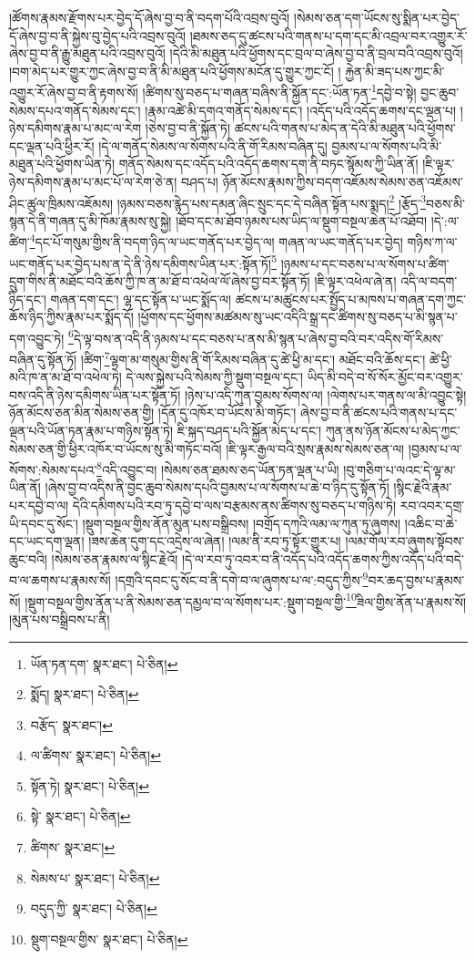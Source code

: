 །ཚོགས་རྣམས་རྫོགས་པར་བྱེད་དོ་ཞེས་བྱ་བ་ནི་བདག་པོའི་འབྲས་བུའོ། །སེམས་ཅན་དག་ཡོངས་སུ་སྨིན་པར་བྱེད་དོ་ཞེས་བྱ་བ་ནི་སྐྱེས་བུ་བྱེད་པའི་འབྲས་བུའོ། །ཐམས་ཅད་དུ་ཚངས་པའི་གནས་པ་དག་དང་མི་འབྲལ་བར་འགྱུར་རོ་ཞེས་བྱ་བ་ནི་རྒྱུ་མཐུན་པའི་འབྲས་བུའོ། །དེའི་མི་མཐུན་པའི་ཕྱོགས་དང་བྲལ་བ་ཞེས་བྱ་བ་ནི་བྲལ་བའི་འབྲས་བུའོ། །བག་མེད་པར་གྱུར་ཀྱང་ཞེས་བྱ་བ་ནི་མི་མཐུན་པའི་ཕྱོགས་མངོན་དུ་གྱུར་ཀྱང་ངོ། །
རྐྱེན་མི་ཟད་པས་ཀྱང་མི་འགྱུར་རོ་ཞེས་བྱ་བ་ནི་རྟགས་སོ། །ཚིགས་སུ་བཅད་པ་གཞན་བཞིས་ནི་སྐྱོན་དང་:ཡོན་ཏན་\footnote{ཡོན་ཏན་དག་  སྣར་ཐང་།  པེ་ཅིན། }དབྱེ་བ་སྟེ། བྱང་ཆུབ་སེམས་དཔའ་གནོད་སེམས་དང་། །རྣམ་འཚེ་མི་དགའ་གནོད་སེམས་དང་། །འདོད་པའི་འདོད་ཆགས་དང་ལྡན་པ། །ཉེས་དམིགས་རྣམ་པ་མང་ལ་རེག །ཅེས་བྱ་བ་ནི་སྐྱོན་ཏེ། ཚངས་པའི་གནས་པ་མེད་ན་དེའི་མི་མཐུན་པའི་ཕྱོགས་དང་ལྡན་པའི་ཕྱིར་རོ། །དེ་ལ་གནོད་སེམས་ལ་སོགས་པའི་ནི་གོ་རིམས་བཞིན་དུ། བྱམས་པ་ལ་སོགས་པའི་མི་མཐུན་པའི་ཕྱོགས་ཡིན་ཏེ། གནོད་སེམས་དང་འདོད་པའི་འདོད་ཆགས་དག་ནི་བཏང་སྙོམས་ཀྱི་ཡིན་ནོ། །ཇི་ལྟར་ཉེས་དམིགས་རྣམ་པ་མང་པོ་ལ་རེག་ཅེ་ན། བཤད་པ། ཉོན་མོངས་རྣམས་ཀྱིས་བདག་འཇོམས་སེམས་ཅན་འཇོམས་ཤིང་ཚུལ་ཁྲིམས་འཇོམས། །ཉམས་བཅས་རྙེད་པས་དམན་ཞིང་སྲུང་དང་དེ་བཞིན་སྟོན་པས་སྨད།\footnote{སྨོད།  སྣར་ཐང་།  པེ་ཅིན། } །རྩོད་\footnote{བརྩོད་  སྣར་ཐང་། }བཅས་མི་སྙན་དེ་ནི་གཞན་དུ་མི་ཁོམ་རྣམས་སུ་སྐྱེ། །ཐོབ་དང་མ་ཐོབ་ཉམས་པས་ཡིད་ལ་སྡུག་བསྔལ་ཆེན་པོ་འཐོབ། །དེ་:ལ་ཚིག་\footnote{ལ་ཚིགས་  སྣར་ཐང་།  པེ་ཅིན། }དང་པོ་གསུམ་གྱིས་ནི་བདག་ཉིད་ལ་ཡང་གནོད་པར་བྱེད་ལ། གཞན་ལ་ཡང་གནོད་པར་བྱེད། གཉིས་ཀ་ལ་ཡང་གནོད་པར་བྱེད་པས་ན་དེ་ནི་ཉེས་དམིགས་ཡིན་པར་:སྟོན་ཏོ།\footnote{སྟོན་ཏེ།  སྣར་ཐང་།  པེ་ཅིན། } །ཉམས་པ་དང་བཅས་པ་ལ་སོགས་པ་ཚིག་དྲུག་གིས་ནི་མཐོང་བའི་ཆོས་ཀྱི་ཁ་ན་མ་ཐོ་བ་འཕེལ་ལོ་ཞེས་བྱ་བར་སྟོན་ཏོ། །ཇི་ལྟར་འཕེལ་ཞེ་ན། འདི་ལ་བདག་ཉིད་དང་། གཞན་དག་དང་། ལྷ་དང་སྟོན་པ་ཡང་སྨོད་ལ། ཚངས་པ་མཚུངས་པར་སྤྱོད་པ་མཁས་པ་གཞན་དག་ཀྱང་ཆོས་ཉིད་ཀྱིས་རྣམ་པར་སྨོད་དོ། །ཕྱོགས་དང་ཕྱོགས་མཚམས་སུ་ཡང་འདིའི་སྒྲ་དང་ཚིགས་སུ་བཅད་པ་མི་སྙན་པ་དག་འབྱུང་ཏེ། \footnote{སྟེ་  སྣར་ཐང་།  པེ་ཅིན། }དེ་ལྟ་བས་ན་འདི་ནི་ཉམས་པ་དང་བཅས་པ་ནས་མི་སྙན་པ་ཞེས་བྱ་བའི་བར་འདིས་གོ་རིམས་བཞིན་དུ་སྟོན་ཏོ། །ཚིག་\footnote{ཚིགས་  སྣར་ཐང་། }ལྷག་མ་གསུམ་གྱིས་ནི་གོ་རིམས་བཞིན་དུ་ཚེ་ཕྱི་མ་དང་། མཐོང་བའི་ཆོས་དང་། ཚེ་ཕྱི་མའི་ཁ་ན་མ་ཐོ་བ་འཕེལ་ཏེ། དེ་ལས་སྐྱེས་པའི་སེམས་ཀྱི་སྡུག་བསྔལ་དང་། ཡིད་མི་བདེ་བ་སོ་སོར་མྱོང་བར་འགྱུར་བས་འདི་ནི་ཉེས་དམིགས་ཡིན་པར་སྟོན་ཏོ། །ཉེས་པ་འདི་ཀུན་བྱམས་སོགས་ལ། །ལེགས་པར་གནས་ལ་མི་འབྱུང་སྟེ། ཉོན་མོངས་ཅན་མིན་སེམས་ཅན་གྱི། །དོན་དུ་འཁོར་བ་ཡོངས་མི་གཏོང་། ཞེས་བྱ་བ་ནི་ཚངས་པའི་གནས་པ་དང་ལྡན་པའི་ཡོན་ཏན་རྣམ་པ་གཉིས་སྟོན་ཏེ། ཇི་སྐད་བཤད་པའི་སྐྱོན་མེད་པ་དང་། ཀུན་ནས་ཉོན་མོངས་པ་མེད་ཀྱང་སེམས་ཅན་གྱི་ཕྱིར་འཁོར་བ་ཡོངས་སུ་མི་གཏོང་བའོ། །ཇི་ལྟར་རྒྱལ་བའི་སྲས་རྣམས་སེམས་ཅན་ལ། །བྱམས་པ་ལ་སོགས་:སེམས་དཔའ་\footnote{སེམས་པ་  སྣར་ཐང་།  པེ་ཅིན། }འདི་འབྱུང་བ། །སེམས་ཅན་ཐམས་ཅད་ཡོན་ཏན་ལྡན་པ་ཡི། །བུ་གཅིག་པ་ལའང་དེ་ལྟ་མ་ཡིན་ནོ། །ཞེས་བྱ་བ་འདིས་ནི་བྱང་ཆུབ་སེམས་དཔའི་བྱམས་པ་ལ་སོགས་པ་ཆེ་བ་ཉིད་དུ་སྟོན་ཏོ། །སྙིང་རྗེའི་རྣམ་པར་དབྱེ་བ་ལ། དེའི་དམིགས་པའི་རབ་ཏུ་དབྱེ་བ་ལས་བརྩམས་ནས་ཚིགས་སུ་བཅད་པ་གཉིས་ཏེ། རབ་འབར་དགྲ་ཡི་དབང་དུ་སོང་། །སྡུག་བསྔལ་གྱིས་ནོན་མུན་པས་བསྒྲིབས། །བགྲོད་དཀའི་ལམ་ལ་ཀུན་ཏུ་ཞུགས། །འཆིང་བ་ཆེ་དང་ཡང་དག་ལྡན། །ཟས་ཆེན་དུག་དང་འདྲེས་ལ་ཞེན། །ལམ་ནི་རབ་ཏུ་སྟོར་གྱུར་པ། །ལམ་གོལ་རབ་ཞུགས་སྟོབས་ཆུང་བའི། །སེམས་ཅན་རྣམས་ལ་སྙིང་རྗེའོ། །དེ་ལ་རབ་ཏུ་འབར་བ་ནི་འདོད་པའི་འདོད་ཆགས་ཀྱིས་འདོད་པའི་བདེ་བ་ལ་ཆགས་པ་རྣམས་སོ། །དགྲའི་དབང་དུ་སོང་བ་ནི་དགེ་བ་ལ་ཞུགས་པ་ལ་:བདུད་ཀྱིས་\footnote{བདུད་ཀྱི་  སྣར་ཐང་།  པེ་ཅིན། }བར་ཆད་བྱས་པ་རྣམས་སོ། །སྡུག་བསྔལ་གྱིས་ནོན་པ་ནི་སེམས་ཅན་དམྱལ་བ་ལ་སོགས་པར་:སྡུག་བསྔལ་གྱི་\footnote{སྡུག་བསྔལ་གྱིས་  སྣར་ཐང་།  པེ་ཅིན། }ཟིལ་གྱིས་ནོན་པ་རྣམས་སོ། །མུན་པས་བསྒྲིབས་པ་ནི། 